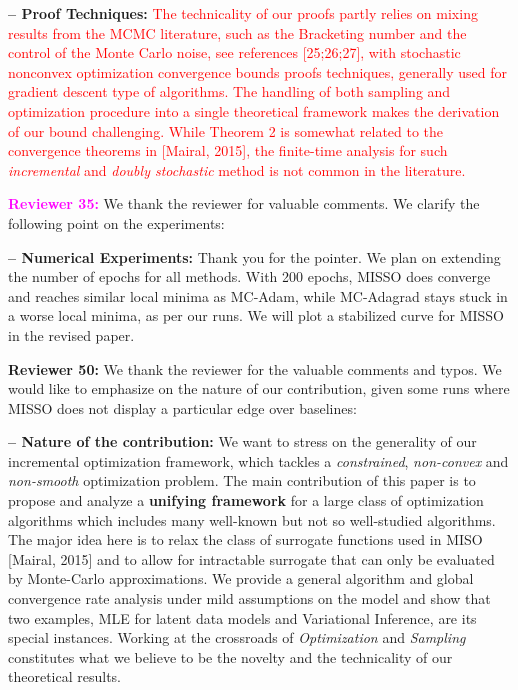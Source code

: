 \documentclass{article}
\begin{document}
\vspace{0.03in}
\textbf{-- Proof Techniques:} 
\textcolor{red}{The technicality of our proofs partly relies on mixing results from the MCMC literature, such as the Bracketing number and the control of the Monte Carlo noise, see references [25;26;27], with stochastic nonconvex optimization convergence bounds proofs techniques, generally used for gradient descent type of algorithms.
The handling of both sampling and optimization procedure into a single theoretical framework makes the derivation of our bound challenging.
While Theorem 2 is somewhat related to the convergence theorems in [Mairal, 2015], the finite-time analysis for such \emph{incremental} and \emph{doubly stochastic} method is not common in the literature.}

\medskip
\textbf{\textcolor{magenta}{Reviewer 35:}} We thank the reviewer for valuable comments. We clarify the following point on the experiments: 

\vspace{0.03in}
\textbf{-- Numerical Experiments:} 
Thank you for the pointer.
We plan on extending the number of epochs for all methods.
With 200 epochs, MISSO does converge and reaches similar local minima as MC-Adam, while MC-Adagrad stays stuck in a worse local minima, as per our runs.
We will plot a stabilized curve for MISSO in the revised paper.


\medskip
\textbf{\textcolor{green!50!black}{Reviewer 50:}} We thank the reviewer for the valuable comments and typos. 
We would like to emphasize on the nature of our contribution, given some runs where MISSO does not display a particular edge over baselines: 


\vspace{0.03in}
\textbf{-- Nature of the contribution:} 
We want to stress on the generality of our incremental optimization framework, which tackles a \emph{constrained}, \emph{non-convex} and \emph{non-smooth} optimization problem. 
The main contribution of this paper is to propose and analyze a \textbf{unifying framework} for a large class of optimization algorithms which includes many well-known but not so well-studied algorithms.
The major idea here is to relax the class of surrogate functions used in MISO [Mairal, 2015] and to allow for intractable surrogate that can only be evaluated by Monte-Carlo approximations.
We provide a general algorithm and global convergence rate analysis under mild assumptions on the model and show that two examples, MLE for latent data models and Variational Inference, are its special instances.
Working at the crossroads of \emph{Optimization} and \emph{Sampling} constitutes what we believe to be the novelty and the technicality of our theoretical results.
\end{document}
